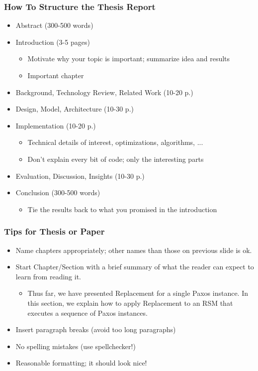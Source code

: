 \documentclass[hyperref={pdfpagelabels=false}, aspectratio=1610]{beamer}
\begin{document}
\begin{frame}
\frametitle{How To Structure the Thesis Report}
\begin{block}{}
 \begin{itemize}
  \item Abstract (300-500 words)
  \item Introduction (3-5 pages)
  \begin{itemize}
  	\item Motivate why your topic is important; summarize idea and results
	\item Important chapter
  \end{itemize}
  \item Background, Technology Review, Related Work (10-20 p.)
  \item Design, Model, Architecture (10-30 p.)
  \item Implementation (10-20 p.)
  \begin{itemize}
   \item Technical details of interest, optimizations, algorithms, ...
   \item Don't explain every bit of code; only the interesting parts
  \end{itemize}
  \item Evaluation, Discussion, Insights (10-30 p.)
  \item Conclusion (300-500 words)
  \begin{itemize}
  	\item Tie the results back to what you promised in the introduction
  \end{itemize}
 \end{itemize}
\end{block}
\end{frame}

\begin{frame}
\frametitle{Tips for Thesis or Paper}
\begin{block}{}
 \begin{itemize}
  \item Name chapters appropriately; other names than those on previous slide is ok.
  \item Start Chapter/Section with a brief summary of what the reader can expect to learn from reading it.
  \begin{itemize}
   \item Thus far, we have presented Replacement for a single Paxos instance. In this section, we explain how to apply Replacement to an RSM that executes a sequence of Paxos instances.
  \end{itemize}
  \item Insert paragraph breaks (avoid too long paragraphs)
  \item No spelling mistakes (use spellchecker!)
  \item Reasonable formatting; it should look nice!
 \end{itemize}
\end{block}
\end{frame}
\end{document}
